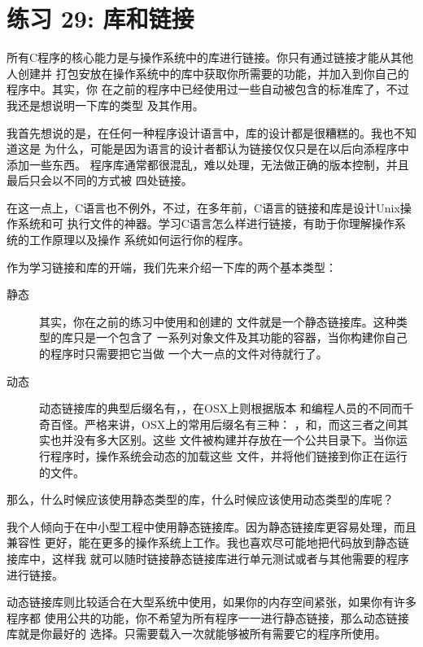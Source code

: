 \chapter{练习 29: 库和链接}

所有C程序的核心能力是与操作系统中的库进行链接。你只有通过链接才能从其他人创建并
打包安放在操作系统中的库中获取你所需要的功能，并加入到你自己的程序中。其实，你
在之前的程序中已经使用过一些自动被包含的标准库了，不过我还是想说明一下库的类型
及其作用。

我首先想说的是，在任何一种程序设计语言中，库的设计都是很糟糕的。我也不知道这是
为什么，可能是因为语言的设计者都认为链接仅仅只是在以后向添程序中添加一些东西。
程序库通常都很混乱，难以处理，无法做正确的版本控制，并且最后只会以不同的方式被
四处链接。

在这一点上，C语言也不例外，不过，在多年前，C语言的链接和库是设计Unix操作系统和可
执行文件的神器。学习C语言怎么样进行链接，有助于你理解操作系统的工作原理以及操作
系统如何运行你的程序。

作为学习链接和库的开端，我们先来介绍一下库的两个基本类型：

\begin{description}
\item[静态] 其实，你在之前的练习中使用和创建的
    文件就是一个静态链接库。这种类型的库只是一个包含了
    一系列对象文件及其功能的容器，当你构建你自己的程序时只需要把它当做
    一个大一点的文件对待就行了。
\item[动态] 动态链接库的典型后缀名有，，在OSX上则根据版本
    和编程人员的不同而千奇百怪。严格来讲，OSX上的常用后缀名有三种：
    ，和，而这三者之间其实也并没有多大区别。这些
    文件被构建并存放在一个公共目录下。当你运行程序时，操作系统会动态的加载这些
    文件，并将他们链接到你正在运行的文件。
\end{description}

那么，什么时候应该使用静态类型的库，什么时候应该使用动态类型的库呢？

我个人倾向于在中小型工程中使用静态链接库。因为静态链接库更容易处理，而且兼容性
更好，能在更多的操作系统上工作。我也喜欢尽可能地把代码放到静态链接库中，这样我
就可以随时链接静态链接库进行单元测试或者与其他需要的程序进行链接。

动态链接库则比较适合在大型系统中使用，如果你的内存空间紧张，如果你有许多程序都
使用公共的功能，你不希望为所有程序一一进行静态链接，那么动态链接库就是你最好的
选择。只需要载入一次就能够被所有需要它的程序所使用。

